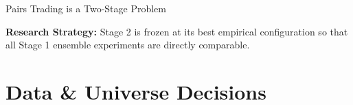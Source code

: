 \documentclass[aspectratio=169,10pt]{beamer}
\begin{document}
\begin{frame}{Pairs Trading is a Two-Stage Problem}
\begin{center}
  \end{center}
  \vspace{6pt}
  \small\textbf{Research Strategy:} Stage 2 is \alert{frozen} at its best empirical configuration so that all Stage 1 ensemble experiments are directly comparable.
\end{frame}

\section{Data \& Universe Decisions}
\end{document}
